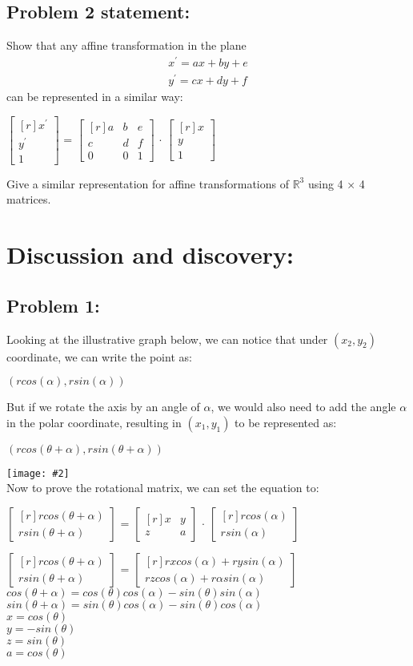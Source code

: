 \documentclass[11pt]{article}
\newcommand{\image}[2]{\texttt{[image: \#2]}}
\newcommand{\mat}[1]{
    $\begin{bmatrix*}[r]
        #1
    \end{bmatrix*}$
} %
\newcommand{\myalign}[1]{\begin{align*}#1\end{align*}}
\newcommand{\gap}{\vspace*{0.5cm}}
\begin{document}
\subsection*{Problem 2 statement:}
Show that any affine transformation in the plane
\myalign{
  x^{'} = ax + by + e \\
  y^{'} = cx + dy + f
}
can be represented in a similar way:
\begin{center}
  \mat{
    x^{'} \\
    y^{'} \\
    1
  } = \mat{
    a & b & e \\
    c & d & f \\
    0 & 0 & 1
  } $\cdot$ \mat{
    x \\
    y \\
    1
  }
\end{center}
Give a similar representation for affine transformations of $\mathbb{R}^3$ using 4 × 4 matrices.

\section{Discussion and discovery:}
\subsection{Problem 1:}
Looking at the illustrative graph below, we can notice that under $(x_2, y_2)$ coordinate, we can write
the point as:
\begin{center}
  $(rcos(\alpha), rsin(\alpha))$
\end{center}
But if we rotate the axis by an angle of $\alpha$, we would also need to add the angle $\alpha$ in the polar coordinate, resulting in $(x_1, y_1)$ to be represented as:
\begin{center}
  $(rcos(\theta + \alpha), rsin(\theta + \alpha))$
\end{center}
\image{0.22}{img4} \\
Now to prove the rotational matrix, we can set the equation to:
\begin{center}
  \mat{
    rcos(\theta + \alpha) \\
    rsin(\theta + \alpha)
  } = \mat{
    x & y \\
    z & a
  } $\cdot$ \mat{
    rcos(\alpha) \\
    rsin(\alpha)
  } \\
  \gap
  \mat{
    rcos(\theta + \alpha) \\
    rsin(\theta + \alpha)
  } = \mat{
    rxcos(\alpha) + rysin(\alpha) \\
    rzcos(\alpha) + r\alpha sin(\alpha)
  } \\
  \gap
  $cos(\theta + \alpha) = cos(\theta)cos(\alpha)-sin(\theta)sin(\alpha)$ \\
  $sin(\theta + \alpha) = sin(\theta)cos(\alpha)-sin(\theta)cos(\alpha)$ \\
  $x = cos(\theta)$ \\
  $y = -sin(\theta)$ \\
  $z = sin(\theta)$ \\
  $a = cos(\theta)$ \\
\end{center}
\end{document}
